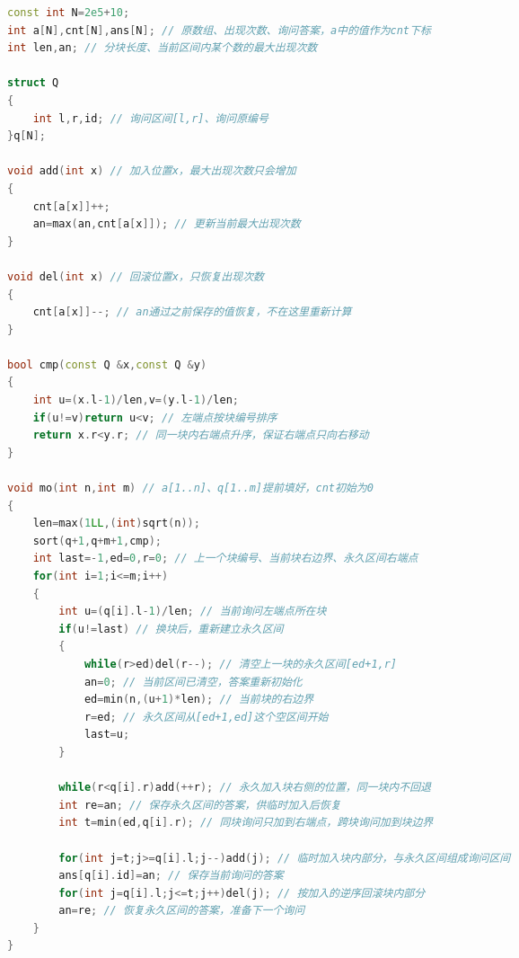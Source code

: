 \documentclass[10pt,landscape,a4paper]{article}
\begin{document}
\begin{multicols*}{3}
\begin{lstlisting}[language=C++]
const int N=2e5+10;
int a[N],cnt[N],ans[N]; // 原数组、出现次数、询问答案，a中的值作为cnt下标
int len,an; // 分块长度、当前区间内某个数的最大出现次数

struct Q
{
    int l,r,id; // 询问区间[l,r]、询问原编号
}q[N];

void add(int x) // 加入位置x，最大出现次数只会增加
{
    cnt[a[x]]++;
    an=max(an,cnt[a[x]]); // 更新当前最大出现次数
}

void del(int x) // 回滚位置x，只恢复出现次数
{
    cnt[a[x]]--; // an通过之前保存的值恢复，不在这里重新计算
}

bool cmp(const Q &x,const Q &y)
{
    int u=(x.l-1)/len,v=(y.l-1)/len;
    if(u!=v)return u<v; // 左端点按块编号排序
    return x.r<y.r; // 同一块内右端点升序，保证右端点只向右移动
}

void mo(int n,int m) // a[1..n]、q[1..m]提前填好，cnt初始为0
{
    len=max(1LL,(int)sqrt(n));
    sort(q+1,q+m+1,cmp);
    int last=-1,ed=0,r=0; // 上一个块编号、当前块右边界、永久区间右端点
    for(int i=1;i<=m;i++)
    {
        int u=(q[i].l-1)/len; // 当前询问左端点所在块
        if(u!=last) // 换块后，重新建立永久区间
        {
            while(r>ed)del(r--); // 清空上一块的永久区间[ed+1,r]
            an=0; // 当前区间已清空，答案重新初始化
            ed=min(n,(u+1)*len); // 当前块的右边界
            r=ed; // 永久区间从[ed+1,ed]这个空区间开始
            last=u;
        }

        while(r<q[i].r)add(++r); // 永久加入块右侧的位置，同一块内不回退
        int re=an; // 保存永久区间的答案，供临时加入后恢复
        int t=min(ed,q[i].r); // 同块询问只加到右端点，跨块询问加到块边界

        for(int j=t;j>=q[i].l;j--)add(j); // 临时加入块内部分，与永久区间组成询问区间
        ans[q[i].id]=an; // 保存当前询问的答案
        for(int j=q[i].l;j<=t;j++)del(j); // 按加入的逆序回滚块内部分
        an=re; // 恢复永久区间的答案，准备下一个询问
    }
}
\end{lstlisting}

\end{multicols*}
\end{document}
